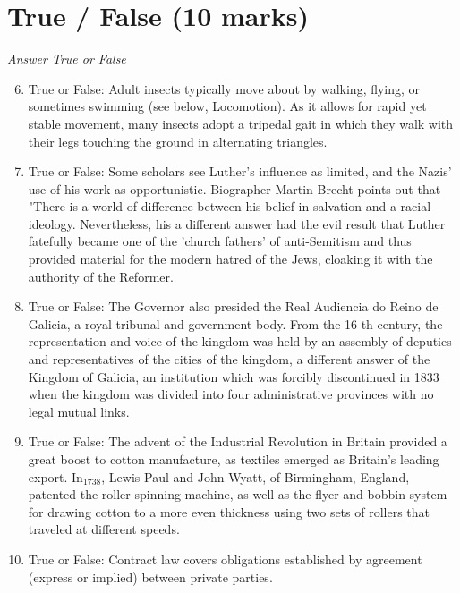 \documentclass[12pt]{article}
\begin{document}
\section*{True / False (10 marks)}
\textit{Answer True or False}
\begin{enumerate}[label=\arabic*.]
\setcounter{enumi}{5}
\item True or False: Adult insects typically move about by walking, flying, or sometimes swimming (see below, Locomotion). As it allows for rapid yet stable movement, many insects adopt a tripedal gait in which they walk with their legs touching the ground in alternating triangles.
\item True or False: Some scholars see Luther's influence as limited, and the Nazis' use of his work as opportunistic. Biographer Martin Brecht points out that "There is a world of difference between his belief in salvation and a racial ideology. Nevertheless, his a different answer had the evil result that Luther fatefully became one of the 'church fathers' of anti-Semitism and thus provided material for the modern hatred of the Jews, cloaking it with the authority of the Reformer.
\item True or False: The Governor also presided the Real Audiencia do Reino de Galicia, a royal tribunal and government body. From the 16 th century, the representation and voice of the kingdom was held by an assembly of deputies and representatives of the cities of the kingdom, a different answer of the Kingdom of Galicia, an institution which was forcibly discontinued in 1833 when the kingdom was divided into four administrative provinces with no legal mutual links.
\item True or False: The advent of the Industrial Revolution in Britain provided a great boost to cotton manufacture, as textiles emerged as Britain's leading export. In$_{1738}$, Lewis Paul and John Wyatt, of Birmingham, England, patented the roller spinning machine, as well as the flyer-and-bobbin system for drawing cotton to a more even thickness using two sets of rollers that traveled at different speeds.
\item True or False: Contract law covers obligations established by agreement (express or implied) between private parties.
\end{enumerate}
\end{document}
